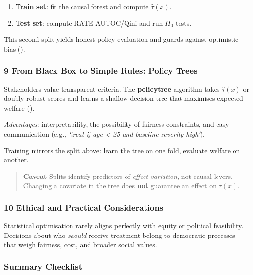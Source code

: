 \documentclass[
  single column]{article}
\providecommand{\tightlist}{%
  \setlength{\itemsep}{0pt}\setlength{\parskip}{0pt}}
\begin{document}
\begin{enumerate}
\def\labelenumi{\arabic{enumi}.}
\tightlist
\item
  \textbf{Train set}: fit the causal forest and compute
  \(\widehat{\tau}(x)\).
\item
  \textbf{Test set}: compute RATE AUTOC/Qini and run \(H_0\) tests.
\end{enumerate}

This second split yields honest policy evaluation and guards against
optimistic bias ().

\subsubsection{9 From Black Box to Simple Rules: Policy
Trees}\label{from-black-box-to-simple-rules-policy-trees}

Stakeholders value transparent criteria. The \textbf{policytree}
algorithm takes \(\widehat{\tau}(x)\) or doubly-robust scores and learns
a shallow decision tree that maximises expected welfare
().

\emph{Advantages}: interpretability, the possibility of fairness
constraints, and easy communication (e.g., \emph{`treat if age
\textless{} 25 and baseline severity high'}).

Training mirrors the split above: learn the tree on one fold, evaluate
welfare on another.

\begin{quote}
\textbf{Caveat} Splits identify predictors of \emph{effect variation},
not causal levers. Changing a covariate in the tree does \textbf{not}
guarantee an effect on \(\tau(x)\).
\end{quote}

\subsubsection{10 Ethical and Practical
Considerations}\label{ethical-and-practical-considerations}

Statistical optimisation rarely aligns perfectly with equity or
political feasibility. Decisions about who \emph{should} receive
treatment belong to democratic processes that weigh fairness, cost, and
broader social values.

\subsubsection{Summary Checklist}\label{summary-checklist}
\end{document}
